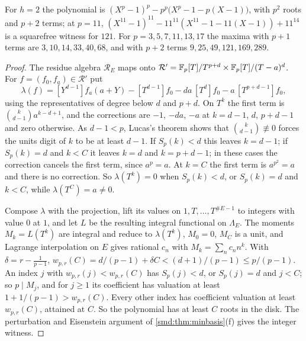 For $h=2$ the polynomial is $(X^p-1)^p-p^p\bigl(X^p-1-p(X-1)\bigr)$, with $p^2$ roots and $p+2$
terms; at $p=11$, $(X^{11}-1)^{11}-11^{11}(X^{11}-1-11(X-1))+11^{14}$ is a squarefree witness
for $121$. For $p=3,5,7,11,13,17$ the maxima with $p+1$ terms are $3,10,14,33,40,68$, and with
$p+2$ terms $9,25,49,121,169,289$.


\begin{proof}
The residue algebra $\mathcal R_E$ maps onto
$\mathcal R'=\mathbb{F}_p[T]/T^{p+d}\times\mathbb{F}_p[T]/(T-a)^d$. For $f=(f_0,f_a)\in\mathcal R'$ put
\[
 \lambda(f)=[Y^{d-1}]f_a(a+Y)-[T^{d-1}]f_0-da\,[T^d]f_0-a\,[T^{p+d-1}]f_0 ,
\]
using the representatives of degree below $d$ and $p+d$. On $T^k$ the first term is
$\binom k{d-1}a^{k-d+1}$, and the corrections are $-1$, $-da$, $-a$ at $k=d-1$, $d$, $p+d-1$ and
zero otherwise. As $d-1<p$, Lucas's theorem shows that $\binom k{d-1}\not\equiv0$ forces the
units digit of $k$ to be at least $d-1$. If $S_p(k)<d$ this leaves $k=d-1$; if $S_p(k)=d$ and
$k<C$ it leaves $k=d$ and $k=p+d-1$; in these cases the correction cancels the first term,
since $a^p=a$. At $k=C$ the first term is $a^{p^2}=a$ and there is no correction. So
$\lambda(T^k)=0$ when $S_p(k)<d$, or $S_p(k)=d$ and $k<C$, while $\lambda(T^C)=a\ne0$.

Compose $\lambda$ with the projection, lift its values on $1,T,\dots,T^{\#E-1}$ to integers with
value $0$ at $1$, and let $L$ be the resulting integral functional on $\Lambda_E$. The moments
$M_k=L(T^k)$ are integral and reduce to $\lambda(T^k)$, $M_0=0$, $M_C$ is a unit, and Lagrange
interpolation on $E$ gives rational $c_n$ with $M_k=\sum_nc_nn^k$. With
$\delta=r-\frac1{p-1}$, $w_{p,r}(C)=d/(p-1)+\delta C<(d+1)/(p-1)\le p/(p-1)$. An index $j$ with
$w_{p,r}(j)<w_{p,r}(C)$ has $S_p(j)<d$, or $S_p(j)=d$ and $j<C$; so $p\mid M_j$, and for $j\ge1$
its coefficient has valuation at least $1+1/(p-1)>w_{p,r}(C)$. Every other index has coefficient
valuation at least $w_{p,r}(C)$, attained at $C$. So the polynomial has at least $C$ roots in the
disk. The perturbation and Eisenstein argument of \cref{smd:thm:minbasis}(f) gives the integer
witness.
\end{proof}

